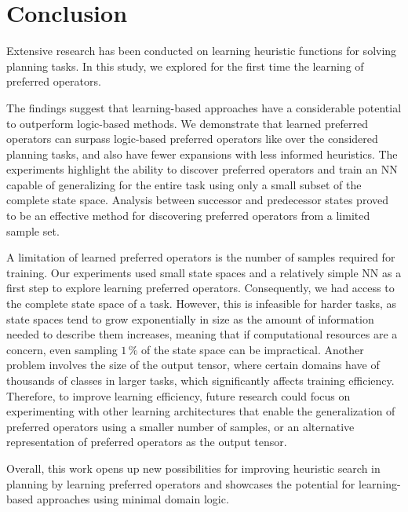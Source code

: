 \documentclass[ppgc,diss,english]{iiufrgs}
\begin{document}
\chapter{Conclusion}
\label{cha:conclusion}
Extensive research has been conducted on learning heuristic functions for solving planning tasks. In this study, we explored for the first time the learning of preferred operators.

The findings suggest that learning-based approaches have a considerable potential to outperform logic-based methods. We demonstrate that learned preferred operators can surpass logic-based preferred operators like \poff over the considered planning tasks, and also have fewer expansions with less informed heuristics. %
The experiments highlight the ability to discover preferred operators and train an NN capable of generalizing for the entire task using only a small subset of the complete state space. Analysis between successor and predecessor states proved to be an effective method for discovering preferred operators from a limited sample set.

A limitation of learned preferred operators is the number of samples required for training. Our experiments used small state spaces and a relatively simple NN as a first step to explore learning preferred operators. Consequently, we had access to the complete state space of a task. However, this is infeasible for harder tasks, as state spaces tend to grow exponentially in size as the amount of information needed to describe them increases, meaning that if computational resources are a concern, even sampling $1\,\%$ of the state space can be impractical. Another problem involves the size of the output tensor, where certain domains have of thousands of classes in larger tasks, which significantly affects training efficiency.
Therefore, to improve learning efficiency, future research could focus on experimenting with other learning architectures that enable the generalization of preferred operators using a smaller number of samples, or an alternative representation of preferred operators as the output tensor.

Overall, this work opens up new possibilities for improving heuristic search in planning by learning preferred operators and showcases the potential for learning-based approaches using minimal domain logic.



\end{document}
